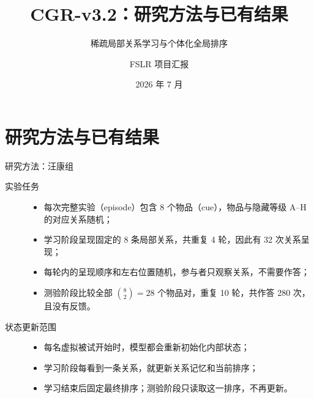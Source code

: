 \documentclass[aspectratio=169,11pt]{beamer}
\title{CGR-v3.2：研究方法与已有结果}
\subtitle{稀疏局部关系学习与个体化全局排序}
\author{FSLR 项目汇报}
\institute{基于 Liu, Wang \& Luo (2026) 的行为机制复现}
\date{2026 年 7 月}
\begin{document}
{
\begin{frame}[plain]
  \titlepage
\end{frame}
}

\section{研究方法与已有结果}

\begin{frame}{研究方法：汪康组}
  \small
  \begin{description}
    \item[实验任务]
      \begin{itemize}
        \item 每次完整实验（episode）包含 8 个物品（cue），物品与隐藏等级 A--H 的对应关系随机；
        \item 学习阶段呈现固定的 8 条局部关系，共重复 4 轮，因此有 32 次关系呈现；
        \item 每轮内的呈现顺序和左右位置随机，参与者只观察关系，不需要作答；
        \item 测验阶段比较全部 $\binom{8}{2}=28$ 个物品对，重复 10 轮，共作答 280 次，且没有反馈。
      \end{itemize}

    \item[状态更新范围]
      \begin{itemize}
        \item 每名虚拟被试开始时，模型都会重新初始化内部状态；
        \item 学习阶段每看到一条关系，就更新关系记忆和当前排序；
        \item 学习结束后固定最终排序；测验阶段只读取这一排序，不再更新。
      \end{itemize}
  \end{description}
\end{frame}
\end{document}
